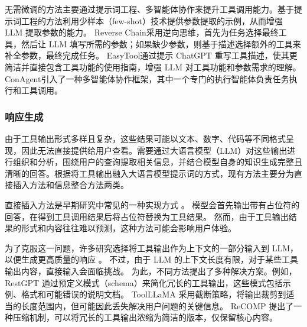 无需微调的方法主要通过提示词工程、多智能体协作来提升工具调用能力。基于提示词工程的方法利用少样本（few-shot）技术提供参数提取的示例，从而增强 LLM 提取参数的能力\cite{Song2023, Liu2023a, Liu2024, hsieh2023tool}。
Reverse Chain\cite{zhang2023reverse}采用逆向思维，首先为任务选择最终工具，然后让 LLM 填写所需的参数；如果缺少参数，则基于描述选择额外的工具来补全参数，最终完成任务。
EasyTool\cite{yuan2024easytool}通过提示 ChatGPT 重写工具描述，使其更简洁并直接包含工具功能的使用指南，增强 LLM 对工具功能和参数需求的理解。
ConAgent\cite{shi2024learning}引入了一种多智能体协作框架，其中一个专门的执行智能体负责任务执行和工具调用。

\subsubsection{响应生成}

由于工具输出形式多样且复杂，这些结果可能以文本、数字、代码等不同格式呈现，因此无法直接提供给用户查看。需要通过大语言模型（LLM）对这些输出进行组织和分析，围绕用户的查询提取相关信息，并结合模型自身的知识生成完整且清晰的回答。根据将工具输出融入大语言模型提示词的方式，现有方法主要分为直接插入方法和信息整合方法两类。

直接插入方法是早期研究中常见的一种实现方式 \cite{schick2024toolformer, wang2024tools, hao2024toolkengpt}。
模型会首先输出带有占位符的回答，在得到工具调用结果后将占位符替换为工具结果。
然而，由于工具输出结果的形式和内容往往难以预测，这种方法可能会影响用户体验。

为了克服这一问题，许多研究选择将工具输出作为上下文的一部分输入到 LLM，以便生成更高质量的响应 \cite{shen2024hugginggpt,}。
不过，由于 LLM 的上下文长度有限，对于某些工具输出内容，直接输入会面临挑战。
为此，不同方法提出了多种解决方案。例如，RestGPT \cite{Song2023} 通过预定义模式（schema）来简化冗长的工具输出，这些模式包括示例、格式和可能错误的说明文档。
ToolLLaMA \cite{Qin2023} 采用截断策略，将输出裁剪到适当的长度范围内，但可能因此丢失解决用户问题的关键信息。
ReCOMP \cite{xu2023recomp} 提出了一种压缩机制，可以将冗长的工具输出浓缩为简洁的版本，仅保留核心内容。


